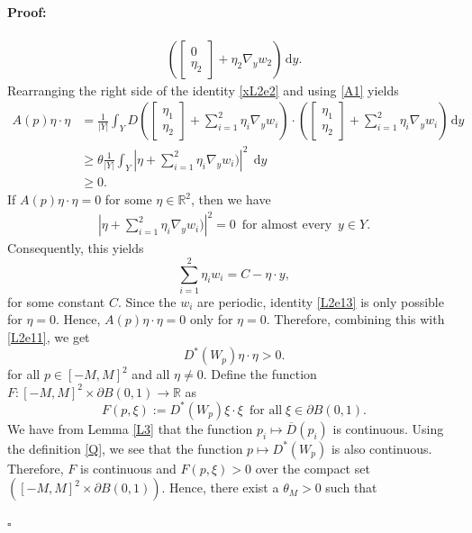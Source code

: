 \documentclass[10pt,a4paper]{amsart}
\newcommand{\di}[1]{\,\mathrm{d}#1}
\newenvironment{proof}{\paragraph{Proof:}}{\hfill$\square$}
\begin{document}
\begin{proof}
\begin{align}
    (\begin{bmatrix} 0 \\ \eta_2  \end{bmatrix}+\eta_2\nabla_y w_2)\di{y}\label{xL2e2}.
      \end{align}
      Rearranging the right side of the identity \eqref{xL2e2} and using \ref{A1} yields
    \begin{align}
           A(p)\eta\cdot\eta&=\frac{1}{|Y|}\int_Y D(\begin{bmatrix} \eta_1 \\ \eta_2  \end{bmatrix}+\sum_{i=1}^2\eta_i\nabla_yw_i)\cdot 
    (\begin{bmatrix} \eta_1 \\ \eta_2  \end{bmatrix}+\sum_{i=1}^2\eta_i\nabla_yw_i)\di{y}\nonumber\\
    &\geq \theta\frac{1}{|Y|}\int_Y |\eta+ \sum_{i=1}^2\eta_i\nabla_yw_i)|^2\;\di{y}\nonumber\\
    &\geq 0.\label{L2e12}
\end{align}
If $A(p)\eta\cdot\eta=0$ for some $\eta\in \mathbb{R}^2$, then we have
\begin{align*}
|\eta+ \sum_{i=1}^2\eta_i\nabla_yw_i)|^2=0 \,\,\,\mbox{for almost every }\, y\in Y.
\end{align*}
Consequently, this yields
\begin{equation}
\sum_{i=1}^2\eta_iw_i=C-\eta\cdot y,\label{L2e13}
\end{equation}
for some constant $C $.
Since the $w_i$ are periodic, identity \eqref{L2e13} is only possible for $\eta=0$.
Hence, $A(p)\eta\cdot \eta=0$ only for $\eta= 0$.
Therefore, combining this with \eqref{L2e11}, we get
\begin{equation}\label{L2e15}
    D^*(W_p)\eta\cdot \eta> 0.
\end{equation}
for all $p\in [-M,M]^2$ and all $\eta\neq0$.
 Define the function $F:[-M,M]^2\times \partial B(0,1)\rightarrow \mathbb{R}$ as 
\begin{equation*}
    F(p,\xi):= D^*(W_p)\xi\cdot \xi \,\,\,\mbox{for all}\; \xi\in \partial B(0,1).
\end{equation*}
     We have from Lemma \ref{L3} that  the function $p_i\mapsto \overline{D}(p_i)$ is continuous.
     Using the definition \eqref{Q}, we see that the function $p\mapsto D^*(W_p)$ is also continuous.
     Therefore, $F$ is continuous and $F(p,\xi)>0$ over the compact set $ ([-M,M]^2\times \partial B(0,1))$. Hence, there exist a $\theta_M>0$ such that

\end{proof}
\end{document}
